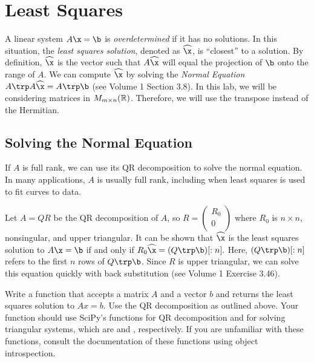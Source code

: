 \label{lab:givens}

\section*{Least Squares} %

A linear system $A\x=\b$ is \emph{overdetermined} if it has no solutions.
In this situation, the \emph{least squares solution}, denoted as $\widehat{\x}$, is ``closest'' to a solution.
By definition, $\widehat{\x}$ is the vector such that $A\widehat{\x}$ will equal the projection of $\b$ onto the range of $A$.
We can compute $\widehat{\x}$ by solving the \emph{Normal Equation} $A\trp A\widehat{\x} = A\trp \b$ (see Volume 1 Section 3.8). In this lab, we will be considering matrices in $M_{m \times n}(\Bbb{R})$. Therefore, we will use the transpose instead of the Hermitian.


\subsection*{Solving the Normal Equation} %

If $A$ is full rank, we can use its QR decomposition to solve the normal equation.
In many applications, $A$ is usually full rank, including when least squares is used to fit curves to data.

Let $A=QR$ be the QR decomposition of $A$, so $R = \left(\begin{array}{c}R_0\\
0\\ \end{array} \right)$
where $R_0$ is $n \times n$, nonsingular, and upper triangular.
It can be shown that $\widehat{\x}$ is the least squares solution to $A\x=\b$ if and only if $R_0\widehat{\x} = (Q\trp \b)[:n].$
Here, $(Q\trp \b)[:n]$ refers to the first $n$ rows of $Q\trp \b$.
Since $R$ is upper triangular, we can solve this equation quickly with back substitution (see Volume 1 Exercise 3.46).

\begin{problem}
Write a function that accepts a matrix $A$ and a vector $b$ and returns the least squares solution to $Ax=b$.
Use the QR decomposition as outlined above.
Your function should use SciPy's functions for QR decomposition and for solving triangular systems, which are  and , respectively. If you are unfamiliar with these functions, consult the documentation of these functions using object introspection.
\end{problem}

